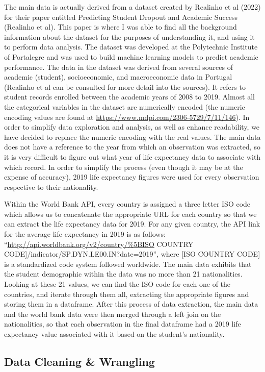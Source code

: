 \documentclass[
]{article}
\begin{document}
The main data is actually derived from a dataset created by Realinho et
al (2022) for their paper entitled Predicting Student Dropout and
Academic Success (Realinho et al). This paper is where I was able to
find all the background information about the dataset for the purposes
of understanding it, and using it to perform data analysis. The dataset
was developed at the Polytechnic Institute of Portalegre and was used to
build machine learning models to predict academic performance. The data
in the dataset was derived from several sources of academic (student),
socioeconomic, and macroeconomic data in Portugal (Realinho et al can be
consulted for more detail into the sources). It refers to student
records enrolled between the academic years of 2008 to 2019. Almost all
the categorical variables in the dataset are numerically encoded (the
numeric encoding values are found at
\url{https://www.mdpi.com/2306-5729/7/11/146}). In order to simplify
data exploration and analysis, as well as enhance readability, we have
decided to replace the numeric encoding with the real values. The main
data does not have a reference to the year from which an observation was
extracted, so it is very difficult to figure out what year of life
expectancy data to associate with which record. In order to simplify the
process (even though it may be at the expense of accuracy), 2019 life
expectancy figures were used for every observation respective to their
nationality.

Within the World Bank API, every country is assigned a three letter ISO
code which allows us to concatenate the appropriate URL for each country
so that we can extract the life expectancy data for 2019. For any given
country, the API link for the average life expectancy in 2019 is as
follows: ``\url{http://api.worldbank.org/v2/country/\%5BISO} COUNTRY
CODE{]}/indicator/SP.DYN.LE00.IN?date=2019'', where {[}ISO COUNTRY
CODE{]} is a standardized code system followed worldwide. The main data
exhibits that the student demographic within the data was no more than
21 nationalities. Looking at these 21 values, we can find the ISO code
for each one of the countries, and iterate through them all, extracting
the appropriate figures and storing them in a dataframe. After this
process of data extraction, the main data and the world bank data were
then merged through a left join on the nationalities, so that each
observation in the final dataframe had a 2019 life expectancy value
associated with it based on the student's nationality.

\hypertarget{data-cleaning-wrangling}{%
\subsection{Data Cleaning \& Wrangling}\label{data-cleaning-wrangling}}
\end{document}
